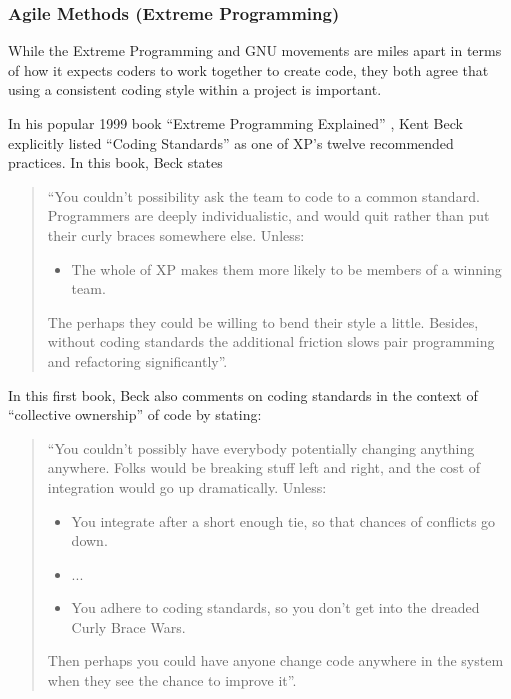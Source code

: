 %
\subsubsection{Agile Methods (Extreme Programming)}
%

While the Extreme Programming and GNU movements are miles apart in terms of
how it expects coders to work together to create code, they both agree that
using a consistent coding style within a project is important.

In his popular 1999 book ``Extreme Programming Explained''
{}\cite{ExtremeProgrammingExplained99}, Kent Beck explicitly listed ``Coding
Standards'' as one of XP's twelve recommended practices.  In this book, Beck
states

\begin{quote}

``You couldn't possibility ask the team to code to a common standard.
Programmers are deeply individualistic, and would quit rather than put their
curly braces somewhere else. Unless:

\begin{itemize}

{}\item The whole of XP makes them more likely to be members of a winning
team.

\end{itemize}

The perhaps they could be willing to bend their style a little.  Besides,
without coding standards the additional friction slows pair programming and
refactoring significantly''.

\end{quote}

In this first book, Beck also comments on coding standards in the context of
``collective ownership'' of code by stating:

\begin{quote}

``You couldn't possibly have everybody potentially changing anything anywhere.
Folks would be breaking stuff left and right, and the cost of integration
would go up dramatically.  Unless:

\begin{itemize}

{}\item You integrate after a short enough tie, so that chances of conflicts
go down.

{}\item ...

{}\item You adhere to coding standards, so you don't get into the dreaded
Curly Brace Wars.

\end{itemize}

Then perhaps you could have anyone change code anywhere in the system when
they see the chance to improve it''.

\end{quote}

